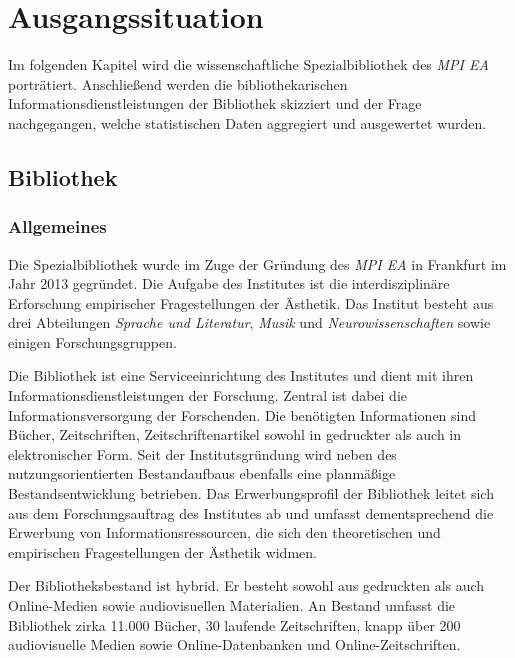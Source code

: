 \chapter{Ausgangssituation}
\label{chap:three}

Im folgenden Kapitel wird die wissenschaftliche Spezialbibliothek des \textit{\acrfull{MPI EA}}
porträtiert. Anschließend werden die bibliothekarischen Informationsdienstleistungen der Bibliothek 
skizziert und der Frage nachgegangen, welche statistischen Daten aggregiert und ausgewertet wurden. 

\section{Bibliothek}
\label{chap:three_one}
\subsection{Allgemeines}
Die Spezialbibliothek wurde im Zuge der Gründung des \textit{\acrshort{MPI EA}}
in Frankfurt im Jahr 2013 gegründet. Die Aufgabe des Institutes ist die interdisziplinäre Erforschung 
empirischer Fragestellungen der Ästhetik. Das Institut besteht aus drei Abteilungen \textit{Sprache und Literatur}, 
\textit{Musik} und \textit{Neurowissenschaften} sowie einigen Forschungsgruppen. %



Die Bibliothek ist eine Serviceeinrichtung des Institutes und dient mit ihren Informationsdienstleistungen 
der Forschung.
Zentral ist dabei die Informationsversorgung der Forschenden. Die benötigten Informationen sind Bücher, 
Zeitschriften, Zeitschriftenartikel sowohl in gedruckter als auch in elektronischer Form.
Seit der Institutsgründung wird neben des nutzungsorientierten Bestandaufbaus ebenfalls eine planmäßige 
Bestandsentwicklung betrieben. Das Erwerbungsprofil der Bibliothek leitet sich aus dem Forschungsauftrag des Institutes 
ab und umfasst dementsprechend die Erwerbung von Informationsressourcen, die sich den theoretischen und 
empirischen Fragestellungen der Ästhetik widmen.

Der Bibliotheksbestand ist hybrid. Er besteht sowohl aus gedruckten als auch Online-Medien sowie 
audiovisuellen Materialien. An Bestand umfasst die Bibliothek zirka 11.000 Bücher, 30 laufende Zeitschriften, 
knapp über 200 audiovisuelle Medien sowie Online-Datenbanken
und Online-Zeitschriften.

